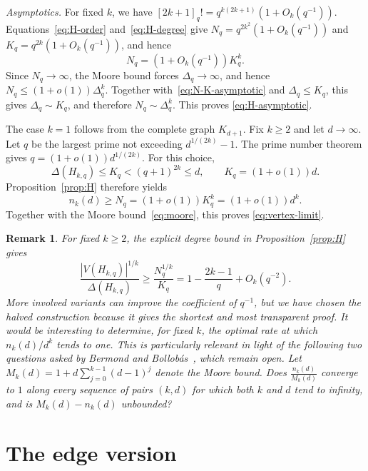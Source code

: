 \documentclass[11pt]{article}
\makeatletter
\theoremstyle{plain}
\newtheorem{remark}[theorem]{Remark}
\theoremstyle{definition}
\renewenvironment{proof}[1][\proofname]
{\par\pushQED{\qed}
	\normalfont\topsep6\p@\@plus6\p@\relax\trivlist
	\item[\hskip\labelsep\bfseries#1\@addpunct{.}]
	\ignorespaces}
{\popQED\endtrivlist\@endpefalse}
\makeatother
\begin{document}
\begin{proof}
\smallskip
\noindent\emph{Asymptotics.}
For fixed $k$, we have
$[2k+1]_q!
=q^{k(2k+1)}\left(1+O_k(q^{-1})\right).$
Equations~\eqref{eq:H-order} and~\eqref{eq:H-degree} give $N_q=q^{2k^2}\left(1+O_k(q^{-1})\right)$ and $K_q=q^{2k}\left(1+O_k(q^{-1})\right)$, 
and hence
\begin{equation}\label{eq:N-K-asymptotic}
  N_q=\left(1+O_k(q^{-1})\right)K_q^k.
\end{equation}
Since $N_q\to\infty$, the Moore bound forces $\Delta_q\to\infty$, and hence $N_q\le(1+o(1))\Delta_q^k$.
Together with~\eqref{eq:N-K-asymptotic} and $\Delta_q\le K_q$, this gives $\Delta_q\sim K_q$, and therefore $N_q\sim\Delta_q^k$.  This proves \eqref{eq:H-asymptotic}.
\end{proof}

\begin{proof}[Proof of Theorem~\ref{thm:vertex}]
The case $k=1$ follows from the complete graph $K_{d+1}$.  Fix $k\ge2$ and let $d\to\infty$.  Let $q$ be the largest prime not exceeding $d^{1/(2k)}-1$.  The prime number theorem gives $q=(1+o(1))d^{1/(2k)}$.
For this choice,
$$\Delta(H_{k,q})\le K_q<(q+1)^{2k}\le d,
  \qquad
  K_q=(1+o(1))d.$$
Proposition~\ref{prop:H} therefore yields
$$n_k(d)\ge N_q=(1+o(1))K_q^k=(1+o(1))d^k.$$
Together with the Moore bound~\eqref{eq:moore}, this proves
\eqref{eq:vertex-limit}.
\end{proof}

\begin{remark}
For fixed $k\ge2$, the explicit degree bound in Proposition~\ref{prop:H} gives
$$\frac{|V(H_{k,q})|^{1/k}}{\Delta(H_{k,q})}
  \ge \frac{N_q^{1/k}}{K_q}
  =1-\frac{2k-1}{q}+O_k(q^{-2}).$$
More involved variants can improve the coefficient of $q^{-1}$, but we have chosen the halved construction because it gives the shortest and most transparent proof. It would be interesting to determine, for fixed $k$, the optimal rate at which $n_k(d)/d^k$ tends to one. This is particularly relevant in light of the following two questions asked by Bermond and Bollob\'as~\cite{BB81}, which remain open. Let
$M_k(d) = 1 + d\sum_{j = 0}^{k - 1}(d - 1)^j$
denote the Moore bound. Does $\frac{n_k(d)}{M_k(d)}$ converge to $1$ along every sequence of pairs $(k,d)$ for which both $k$ and $d$ tend to infinity, and is $M_k(d) - n_k(d)$ unbounded?
\end{remark}


\section{The edge version}
\end{document}
